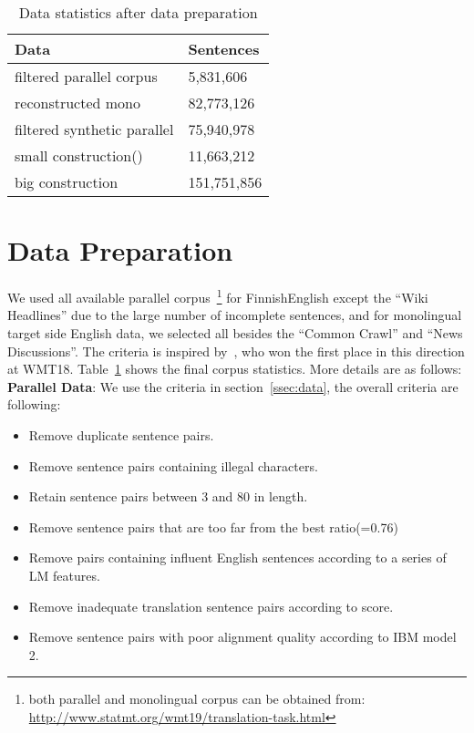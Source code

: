 \documentclass[11pt,a4paper]{article}
\begin{document}
\begin{table}
    \begin{center}
    \begin{tabular}{|l|l|}
    \hline
    \textbf{Data} & \textbf{Sentences}\\ 
    \hline
    filtered parallel corpus& 5,831,606\\ 
    reconstructed mono & 82,773,126\\
    filtered synthetic parallel & 75,940,978\\
    \hline
    small construction(\small{}) & 11,663,212\\
    big construction & 151,751,856\\
    \hline
    \end{tabular}
    \end{center}
    \caption{\label{tab:statics}Data statistics after data preparation}
\end{table}

\section{Data Preparation}
\label{sec:data}
We used all available parallel corpus~\footnote{both parallel and monolingual corpus can be obtained from: \url{http://www.statmt.org/wmt19/translation-task.html}} for FinnishEnglish except the ``Wiki Headlines'' due to the large number of incomplete sentences, and for monolingual target side English data, we selected all besides the ``Common Crawl'' and ``News Discussions''. The criteria is inspired by~\cite{marie-etal-2018-nicts}, who won the first place in this direction at WMT18. Table~\ref{tab:statics} shows the final corpus statistics. More details are as follows:\\

\textbf{Parallel Data}:
We use the criteria in section~\ref{ssec:data}, the overall criteria are following:

\begin{itemize}
\item Remove duplicate sentence pairs.
\item Remove sentence pairs containing illegal characters.
\item Retain sentence pairs between 3 and 80 in length.
\item Remove sentence pairs that are too far from the best ratio(=0.76)
\item Remove pairs containing influent English sentences according to a series of LM features.
\item Remove inadequate translation sentence pairs according to  score.
\item Remove sentence pairs with poor alignment quality according to IBM model 2.
\end{itemize}
\end{document}
